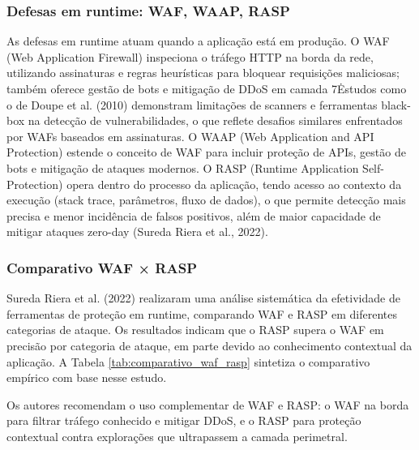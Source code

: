 \begin{table}[htbp]
    \caption{Comparativo SAST, DAST, IAST}
    \label{tab:comparativo_sast_dast_iast}
    
\end{table}

\subsubsection{Defesas em runtime: WAF, WAAP, RASP}

As defesas em runtime atuam quando a aplicação está em produção. O WAF (Web Application Firewall) inspeciona o tráfego HTTP na borda da rede, utilizando assinaturas e regras heurísticas para bloquear requisições maliciosas; também oferece gestão de bots e mitigação de DDoS em camada 7\. Estudos como o de Doupe et al. (2010) demonstram limitações de scanners e ferramentas black-box na detecção de vulnerabilidades, o que reflete desafios similares enfrentados por WAFs baseados em assinaturas. O WAAP (Web Application and API Protection) estende o conceito de WAF para incluir proteção de APIs, gestão de bots e mitigação de ataques modernos. O RASP (Runtime Application Self-Protection) opera dentro do processo da aplicação, tendo acesso ao contexto da execução (stack trace, parâmetros, fluxo de dados), o que permite detecção mais precisa e menor incidência de falsos positivos, além de maior capacidade de mitigar ataques zero-day (Sureda Riera et al., 2022).

\subsubsection{Comparativo WAF × RASP}

Sureda Riera et al. (2022) realizaram uma análise sistemática da efetividade de ferramentas de proteção em runtime, comparando WAF e RASP em diferentes categorias de ataque. Os resultados indicam que o RASP supera o WAF em precisão por categoria de ataque, em parte devido ao conhecimento contextual da aplicação. A Tabela  \ref{tab:comparativo_waf_rasp} sintetiza o comparativo empírico com base nesse estudo.

\begin{table}[htbp]
    \caption{Comparativo empírico WAF × RASP}
    \label{tab:comparativo_waf_rasp}
    
\end{table}

Os autores recomendam o uso complementar de WAF e RASP: o WAF na borda para filtrar tráfego conhecido e mitigar DDoS, e o RASP para proteção contextual contra explorações que ultrapassem a camada perimetral.
